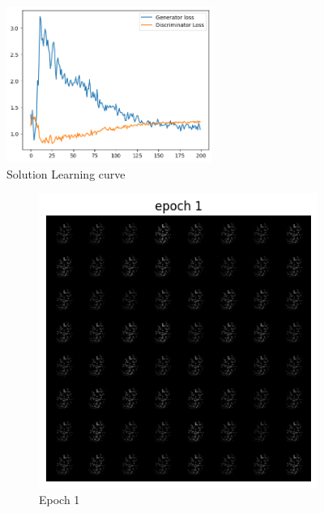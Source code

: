 \documentclass[a4paper]{article}
\theoremstyle{definition}
\newenvironment{soln}{
	\leavevmode\color{blue}\ignorespaces
}{}
\begin{document}
\begin{enumerate} [label=(\alph*)]
\begin{soln}
                \begin{figure}[H]
    			\centering
    			\includegraphics[width=0.6\textwidth]{Images/Q1/Q1c_train.png}
    			\caption{Solution Learning curve}
    			\label{fig:gan_q1c_loss}
    		\end{figure}
                \begin{figure}[H]
    			\centering
    			\begin{subfigure}[b]{0.3\textwidth}
    				\centering
    				\includegraphics[width=\textwidth]{Images/Q1/Q1c_1.png}
    				\caption{Epoch 1}
    			\end{subfigure}
    			\hfill
    			\begin{subfigure}[b]{0.3\textwidth}

\end{subfigure}
\end{figure}
\end{soln}
\end{enumerate}
\end{document}
